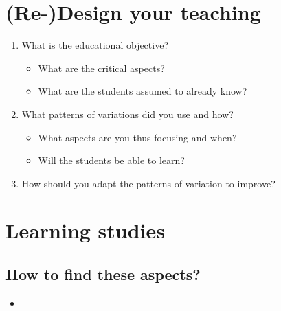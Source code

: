 \section{(Re-)Design your teaching}

\begin{frame}
  \begin{exercise}
    \begin{enumerate}
      \item What is the educational objective?
        \begin{itemize}
          \item What are the critical aspects?
          \item What are the students assumed to already know?
        \end{itemize}
      \item What patterns of variations did you use and how?
        \begin{itemize}
          \item What aspects are you thus focusing and when?
          \item Will the students be able to learn?
        \end{itemize}
      \item How should you adapt the patterns of variation to improve?
    \end{enumerate}
  \end{exercise}
\end{frame}


\section{Learning studies}

\subsection{How to find these aspects?}

\begin{frame}
  \begin{example}
    \begin{itemize}
      \item {}
    \end{itemize}
  \end{example}
\end{frame}

